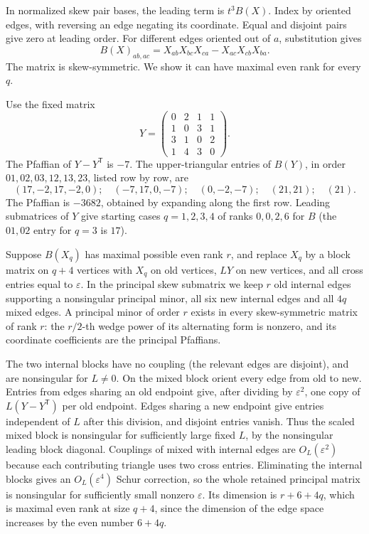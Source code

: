 \documentclass[
  11pt,
]{article}
\begin{document}
In normalized skew pair bases, the leading term is \(t^3B(X)\). Index by
oriented edges, with reversing an edge negating its coordinate. Equal
and disjoint pairs give zero at leading order. For different edges
oriented out of \(a\), substitution gives \[
 B(X)_{ab,ac}=X_{ab}X_{bc}X_{ca}-X_{ac}X_{cb}X_{ba}.
\] The matrix is skew-symmetric. We show it can have maximal even rank
for every \(q\).

Use the fixed matrix \[
Y=\begin{pmatrix}0&2&1&1\\1&0&3&1\\3&1&0&2\\1&4&3&0\end{pmatrix}.
\] The Pfaffian of \(Y-Y^{\mathsf T}\) is \(-7\). The upper-triangular
entries of \(B(Y)\), in order \(01,02,03,12,13,23\), listed row by row,
are \[
 (17,-2,17,-2,0);\quad (-7,17,0,-7);\quad(0,-2,-7);\quad(21,21);\quad(21).
\] The Pfaffian is \(-3682\), obtained by expanding along the first row.
Leading submatrices of \(Y\) give starting cases \(q=1,2,3,4\) of ranks
\(0,0,2,6\) for \(B\) (the \(01,02\) entry for \(q=3\) is \(17\)).

Suppose \(B(X_q)\) has maximal possible even rank \(r\), and replace
\(X_q\) by a block matrix on \(q+4\) vertices with \(X_q\) on old
vertices, \(LY\) on new vertices, and all cross entries equal to
\(\varepsilon\). In the principal skew submatrix we keep \(r\) old
internal edges supporting a nonsingular principal minor, all six new
internal edges and all \(4q\) mixed edges. A principal minor of order
\(r\) exists in every skew-symmetric matrix of rank \(r\): the
\(r/2\)-th wedge power of its alternating form is nonzero, and its
coordinate coefficients are the principal Pfaffians.

The two internal blocks have no coupling (the relevant edges are
disjoint), and are nonsingular for \(L\ne0\). On the mixed block orient
every edge from old to new. Entries from edges sharing an old endpoint
give, after dividing by \(\varepsilon^2\), one copy of
\(L(Y-Y^{\mathsf T})\) per old endpoint. Edges sharing a new endpoint
give entries independent of \(L\) after this division, and disjoint
entries vanish. Thus the scaled mixed block is nonsingular for
sufficiently large fixed \(L\), by the nonsingular leading block
diagonal. Couplings of mixed with internal edges are
\(O_L(\varepsilon^2)\) because each contributing triangle uses two cross
entries. Eliminating the internal blocks gives an \(O_L(\varepsilon^4)\)
Schur correction, so the whole retained principal matrix is nonsingular
for sufficiently small nonzero \(\varepsilon\). Its dimension is
\(r+6+4q\), which is maximal even rank at size \(q+4\), since the
dimension of the edge space increases by the even number \(6+4q\).
\end{document}

